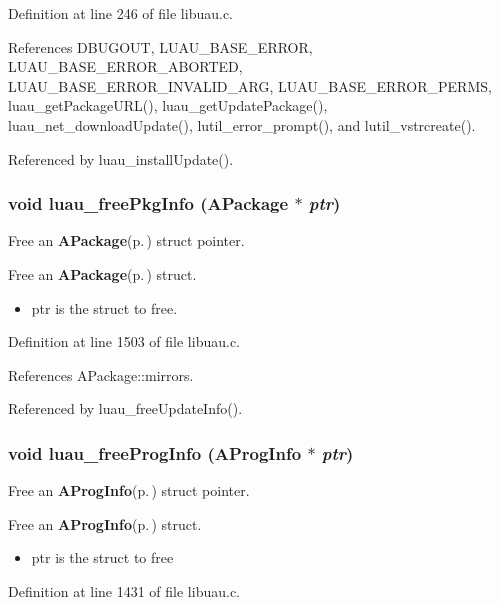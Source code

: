 Definition at line 246 of file libuau.c.

References DBUGOUT, LUAU\_\-BASE\_\-ERROR, LUAU\_\-BASE\_\-ERROR\_\-ABORTED, LUAU\_\-BASE\_\-ERROR\_\-INVALID\_\-ARG, LUAU\_\-BASE\_\-ERROR\_\-PERMS, luau\_\-get\-Package\-URL(), luau\_\-get\-Update\-Package(), luau\_\-net\_\-download\-Update(), lutil\_\-error\_\-prompt(), and lutil\_\-vstrcreate().

Referenced by luau\_\-install\-Update().
\subsubsection{\setlength{\rightskip}{0pt plus 5cm}void luau\_\-free\-Pkg\-Info ({\bf APackage} $\ast$ {\em ptr})}\label{libuau_8h_a98}


Free an {\bf APackage}{\rm (p.\,\pageref{structAPackage})} struct pointer. 

Free an {\bf APackage}{\rm (p.\,\pageref{structAPackage})} struct.

\begin{itemize}
\item ptr is the struct to free. \end{itemize}


Definition at line 1503 of file libuau.c.

References APackage::mirrors.

Referenced by luau\_\-free\-Update\-Info().
\subsubsection{\setlength{\rightskip}{0pt plus 5cm}void luau\_\-free\-Prog\-Info ({\bf AProg\-Info} $\ast$ {\em ptr})}\label{libuau_8h_a96}


Free an {\bf AProg\-Info}{\rm (p.\,\pageref{structAProgInfo})} struct pointer. 

Free an {\bf AProg\-Info}{\rm (p.\,\pageref{structAProgInfo})} struct.

\begin{itemize}
\item ptr is the struct to free \end{itemize}


Definition at line 1431 of file libuau.c.

